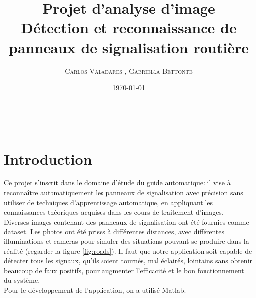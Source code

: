 \documentclass[11pt, french]{article}
\title{\textbf{Projet d'analyse d'image }\\ %
Détection et reconnaissance de panneaux de signalisation routière} %
\author{\textsc{ Carlos Valadares , Gabriella Bettonte} %
\\{\textit{}}} %
\date{\today} %
\makeatletter
\renewcommand{\maketitle}{ %
\begin{flushright} %
{\LARGE\@title} %

\vspace{30pt} %

{\large\@author} %
\\\@date %

\vspace{30pt} %
\end{flushright}
}
\makeatother
\begin{document}
\maketitle %



\section{Introduction}

Ce projet s'inscrit dans le domaine d'étude du guide automatique: il vise à reconnaître automatiquement les panneaux de signalisation avec précision sans utiliser de techniques d’apprentissage automatique, en appliquant les connaissances théoriques acquises dans les cours de traitement d’images.\\

Diverses images contenant des panneaux de signalisation ont été fournies comme dataset. Les photos ont été prises à différentes distances, avec différentes illuminations et cameras pour simuler des situations pouvant se produire dans la réalité (regarder la figure \ref{fig:roads}). Il faut que notre application soit capable de détecter tous les signaux, qu'ils soient tournés, mal éclairés, lointains sans obtenir beaucoup de faux positifs, pour augmenter l'efficacité et le bon fonctionnement du système.\\

Pour le développement de l'application, on a utilisé Matlab.\\
\end{document}

